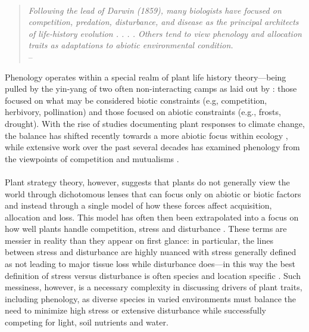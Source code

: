\documentclass[11pt,a4paper,oneside]{article}
\begin{document}
\\
\begin{quote} 
\emph{Following the lead of Darwin (1859), many
biologists have focused on competition, predation, disturbance,
and disease as the principal architects of life-history
evolution . . . . Others
tend to view phenology and allocation traits as adaptations
to abiotic environmental condition.} \\
-- \cite{stanton2000}
\end{quote}
Phenology operates within a special realm of plant life history theory---being pulled by the yin-yang of two often non-interacting camps as laid out by \cite{stanton2000}: those focused on what may be considered biotic constraints (e.g, competition, herbivory, pollination) and those focused on abiotic constraints (e.g., frosts, drought). With the rise of studies documenting plant responses to climate change, the balance has shifted recently towards a more abiotic focus within ecology \citep[e.g.,][]{Inouye:2008gj,Miller-Rushing:2008zv}, while extensive work over the past several decades has examined phenology from the viewpoints of competition \citep[e.g.,][]{Rathcke:1988yc,VANSCHAIK:1993uq} and mutualisms \citep[e.g.,][]{Brody:1997ro}.\\
\\
Plant strategy theory, however, suggests that plants do not generally view the world through dichotomous lenses that can focus only on abiotic or biotic factors and instead through a single model of how these forces affect acquisition, allocation and loss. This model has often then been extrapolated into a focus on how well plants handle competition, stress and disturbance \citep{Grime:1977sw,crainebook}. These terms are messier in reality than they appear on first glance: in particular, the lines between stress and disturbance are highly nuanced with stress generally defined as not leading to major tissue loss while disturbance does---in this way the best definition of stress versus disturbance is often species and location specific \citep{crainebook}. Such messiness, however, is a necessary complexity in discussing drivers of plant traits, including phenology, as diverse species in varied environments must balance the need to minimize high stress or extensive disturbance while successfully competing for light, soil nutrients and water.\\ %
\end{document}

